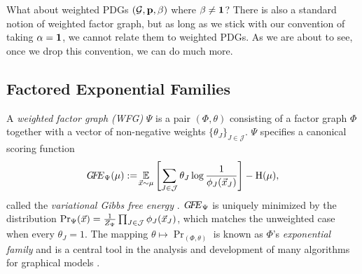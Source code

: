 \documentclass{article}
\begin{document}
	
	
	What about weighted PDGs $(\mathcal G, \mathbf p, \beta)$ where $\beta \ne {\bf 1}$?
	There is also a standard notion of weighted factor graph,
	but as long as we stick with our convention of taking  $\alpha = {\bf 1}$, 
	we cannot relate them to weighted PDGs.  
	As we are about to see,
	once we drop this convention, we can do much more.

	\subsection{Factored Exponential Families}


	A \emph{weighted factor graph (WFG)} $\Psi$ is a pair
	$(\Phi,\theta)$ consisting of a factor graph $\Phi$ 
	together with a vector of non-negative weights
	$\{ \theta_J \}_{J \in \mathcal J}$.
	$\Psi$ specifies a canonical scoring function 
	\begin{equation}
	\mathit{G\mkern-4mu F\mkern-4.5mu E}_{\Psi}(\mu)
		 := \!\operatorname*{\mathbb{E}}_{\vec x\sim\mu}\left[  \sum_{J \in
	           \cal J} \theta_J \log\frac1{\phi_J(\vec
	               x_J)}\right] - \operatorname{\mathrm{H}}(\mu)  , 
				   \label{eqn:free-energy}
	\end{equation}
	called the \emph{variational
	Gibbs free energy} \cite{mezard2009information}. 
	$\mathit{G\mkern-4mu F\mkern-4.5mu E}_{\Psi}$ is uniquely minimized by the distribution
	${\Pr}_{\Psi}(\vec x) = \frac{1}{Z_{\Psi}}
	 	\prod_{J \in \cal J} \phi_J(\vec x_J)$, 
	which matches the unweighted case when every $\theta_J = 1$.
	The mapping $\theta \mapsto \Pr_{(\Phi,\theta)}$ is known as 
	$\Phi$'s \emph{exponential family} and is a central tool in the analysis  
	and development of many algorithms for graphical models \cite{wainwright2008graphical}.
	
\end{document}
